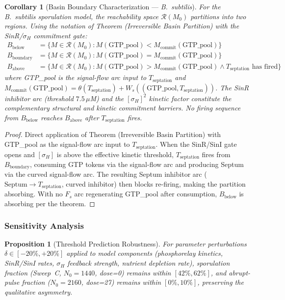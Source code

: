 \documentclass[10pt,letterpaper]{article}
\newtheorem{proposition}{Proposition}
\newtheorem{corollary}[theorem]{Corollary}
\begin{document}
\begin{corollary}[Basin Boundary Characterization --- \textit{B.~subtilis}]
For the \textit{B.~subtilis} sporulation model, the reachability space $\mathcal{R}(M_0)$ partitions into two regions. Using the notation of Theorem (Irreversible Basin Partition) with the SinR/$\sigma_H$ commitment gate:
\begin{align*}
B_{\text{below}} &= \{M \in \mathcal{R}(M_0) : M(\text{GTP\_pool}) < M_{\text{commit}}(\text{GTP\_pool})\} \\
B_{\text{boundary}} &= \{M \in \mathcal{R}(M_0) : M(\text{GTP\_pool}) = M_{\text{commit}}(\text{GTP\_pool})\} \\
B_{\text{above}} &= \{M \in \mathcal{R}(M_0) : M(\text{GTP\_pool}) > M_{\text{commit}}(\text{GTP\_pool}) \wedge T_{\text{septation}}\text{ has fired}\}
\end{align*}
where GTP\_pool is the signal-flow arc input to $T_{\text{septation}}$ and $M_{\text{commit}}(\text{GTP\_pool}) = \theta(T_{\text{septation}}) + W_s((\text{GTP\_pool}, T_{\text{septation}}))$.
The SinR inhibitor arc (threshold $7.5\,\mu$M) and the $[\sigma_H]^2$ kinetic factor constitute the complementary structural and kinetic commitment barriers. No firing sequence from $B_{\text{below}}$ reaches $B_{\text{above}}$ after $T_{\text{septation}}$ fires.
\end{corollary}

\begin{proof}
Direct application of Theorem (Irreversible Basin Partition) with GTP\_pool as the signal-flow arc input to $T_{\text{septation}}$.
When the SinR/SinI gate opens and $[\sigma_H]$ is above the effective kinetic threshold, $T_{\text{septation}}$ fires from $B_{\text{boundary}}$, consuming GTP tokens via the signal-flow arc and producing Septum via the curved signal-flow arc. The resulting Septum inhibitor arc ($\text{Septum} \to T_{\text{septation}}$, curved inhibitor) then blocks re-firing, making the partition absorbing. With no $F_s$ arc regenerating GTP\_pool after consumption, $B_{\text{below}}$ is absorbing per the theorem.
\end{proof}

\subsubsection{Sensitivity Analysis}

\begin{proposition}[Threshold Prediction Robustness]
For parameter perturbations $\delta \in [-20\%, +20\%]$ applied to model components (phosphorelay kinetics, SinR/SinI rates, $\sigma_H$ feedback strength, nutrient depletion rate), sporulation fraction (Sweep~C, $N_0=1440$, dose=0) remains within $[42\%, 62\%]$, and abrupt-pulse fraction ($N_0=2160$, dose=27) remains within $[0\%, 10\%]$, preserving the qualitative asymmetry.
\end{proposition}
\end{document}
